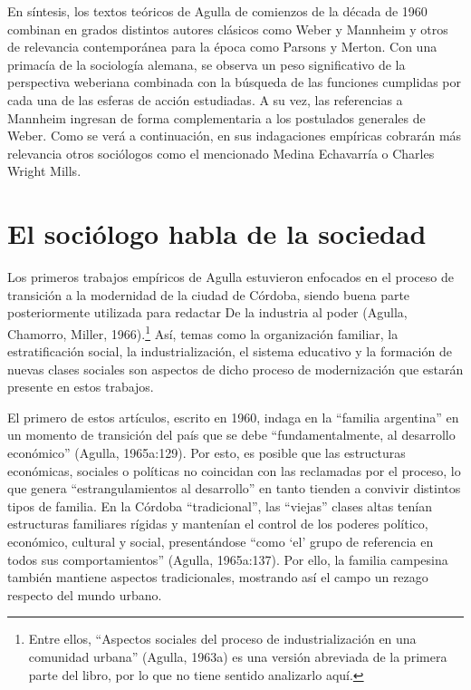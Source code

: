 En síntesis, los textos teóricos de Agulla de comienzos de la década de 1960 combinan en grados distintos autores clásicos como Weber y Mannheim y otros de relevancia contemporánea para la época como Parsons y Merton. Con una primacía de la sociología alemana, se observa un peso significativo de la perspectiva weberiana combinada con la búsqueda de las funciones cumplidas por cada una de las esferas de acción estudiadas. A su vez, las referencias a Mannheim ingresan de forma complementaria a los postulados generales de Weber. Como se verá a continuación, en sus indagaciones empíricas cobrarán más relevancia otros sociólogos como el mencionado Medina Echavarría o Charles Wright Mills.

\section{El sociólogo habla de la sociedad}

Los primeros trabajos empíricos de Agulla estuvieron enfocados en el proceso de transición a la modernidad de la ciudad de Córdoba, siendo buena parte posteriormente utilizada para redactar De la industria al poder (Agulla, Chamorro, Miller, 1966).\footnote{Entre ellos, \enquote{Aspectos sociales del proceso de industrialización en una comunidad urbana} (Agulla, 1963a) es una versión abreviada de la primera parte del libro, por lo que no tiene sentido analizarlo aquí.} Así, temas como la organización familiar, la estratificación social, la industrialización, el sistema educativo y la formación de nuevas clases sociales son aspectos de dicho proceso de modernización que estarán presente en estos trabajos.

El primero de estos artículos, escrito en 1960, indaga en la \enquote{familia argentina} en un momento de transición del país que se debe \enquote{fundamentalmente, al desarrollo económico} (Agulla, 1965a:129). Por esto, es posible que las estructuras económicas, sociales o políticas no coincidan con las reclamadas por el proceso, lo que genera \enquote{estrangulamientos al desarrollo} en tanto tienden a convivir distintos tipos de familia. En la Córdoba \enquote{tradicional}, las \enquote{viejas} clases altas tenían estructuras familiares rígidas y mantenían el control de los poderes político, económico, cultural y social, presentándose \enquote{como \enquote{el} grupo de referencia en todos sus comportamientos} (Agulla, 1965a:137). Por ello, la familia campesina también mantiene aspectos tradicionales, mostrando así el campo un rezago respecto del mundo urbano.

